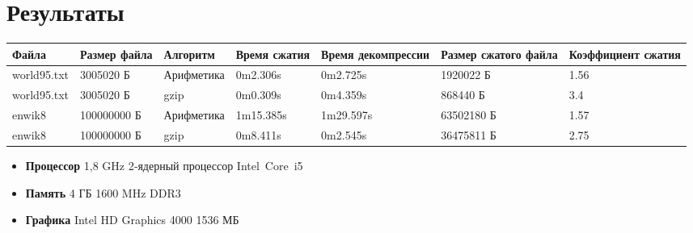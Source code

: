 \section*{Результаты}

\begin{center}
    \begin{tabular}{| l | l | p{70pt} | p{50pt} | p{50pt}  | p{55pt}  | p{70pt} |}
        \hline
        Файла & Размер файла & Алгоритм & Время сжатия & Время декомпрессии & Размер сжатого файла & Коэффициент сжатия \\
        \hline
        world95.txt & 3005020 Б& Арифметика & 0m2.306s & 0m2.725s & 1920022 Б & 1.56 \\
        world95.txt & 3005020 Б& gzip & 0m0.309s & 0m4.359s & 868440 Б & 3.4 \\
        enwik8 & 100000000 Б& Арифметика & 1m15.385s & 1m29.597s & 63502180 Б & 1.57\\
        enwik8 & 100000000 Б& gzip & 0m8.411s & 0m2.545s & 36475811 Б & 2.75\\

        \hline
    \end{tabular}
    \end{center}

\begin{itemize}
    \item \textbf{Процессор} 1,8 GHz 2‑ядерный процессор Intel Core i5
    \item \textbf{Память} 4 ГБ 1600 MHz DDR3
    \item \textbf{Графика} Intel HD Graphics 4000 1536 МБ
\end{itemize}

\pagebreak